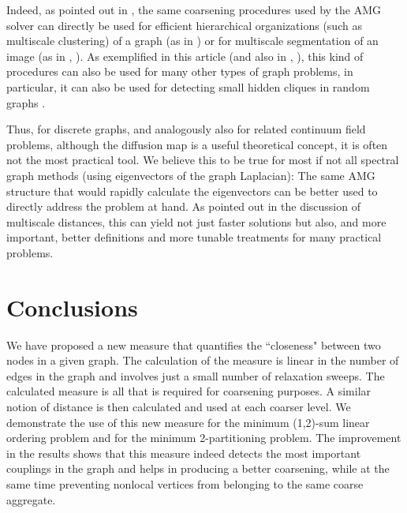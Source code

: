 \documentclass[final]{siamltex}
\begin{document}
Indeed, as pointed out in \cite{amg}, the same coarsening procedures used
by the AMG solver can directly be used for efficient
hierarchical organizations (such as multiscale clustering) of a graph
(as in \cite{Dan1}) or for multiscale segmentation of an image (as in \cite{segm}, \cite{Nature}). As
exemplified in this article (and also in \cite{safro2004}, \cite{safro2005}), this kind
of procedures can also be used for many other types of graph
problems, in particular, it can also be used for detecting small hidden cliques in random graphs \cite{feige-ron-2010}.

Thus, for discrete graphs, and analogously also for related
continuum field problems, although the diffusion map is a useful theoretical concept, it is often not the most practical
tool. We believe this to be true for most if not all spectral
graph methods (using eigenvectors of the graph Laplacian): The
same AMG structure that would rapidly calculate the eigenvectors can be
better used to directly address the problem at hand. As
pointed out in the discussion of multiscale distances, this can yield not just
faster solutions but also, and more important, better
definitions and more tunable treatments for many practical
problems.


\section{Conclusions}
We have proposed a new measure that quantifies the ``closeness" between two nodes in a given graph. The calculation of the measure is linear in the number of edges in the graph and involves just a small number of relaxation sweeps. The calculated measure is all that is required for coarsening purposes. A similar notion of distance is then calculated and used at each coarser level. We demonstrate the use of this new measure for the minimum (1,2)-sum
linear ordering problem and for the minimum 2-partitioning problem. The improvement in the results shows that this measure indeed detects the most important couplings in the graph and helps in producing a better coarsening, while at the same time preventing nonlocal vertices from belonging to the same coarse aggregate.
\end{document}
